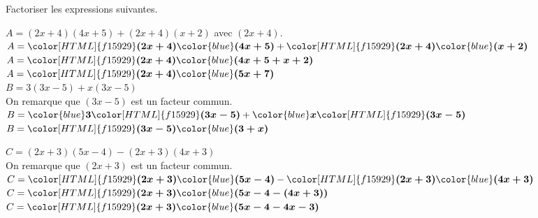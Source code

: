 \begin{corrige}
    Factoriser les expressions suivantes.
    \begin{itemize}
        \def\item{}
        \begin{spacing}{1.2}
            \item $A=(2x+4)(4x+5)+(2x+4)(x+2)$ avec $(2x+4)$.\\
            $A={\color[HTML]{f15929}\boldsymbol{(2x+4)}}{\color{blue}\boldsymbol{(4x+5)}}+{\color[HTML]{f15929}\boldsymbol{(2x+4)}}{\color{blue}\boldsymbol{(x+2)}}$\\
            $A={\color[HTML]{f15929}\boldsymbol{(2x+4)}}{\color{blue}\boldsymbol{(4x+5+x+2)}}$\\
            $A={\color[HTML]{f15929}\boldsymbol{(2x+4)}}{\color{blue}\boldsymbol{(5x+7)}}$\\
            \item $B = 3(3x-5)+x(3x-5)$\\
            On remarque que $(3x-5)$ est un facteur commun.\\
            $B={\color{blue}\boldsymbol{3}}{\color[HTML]{f15929}\boldsymbol{(3x-5)}}+{\color{blue}\boldsymbol{x}}{\color[HTML]{f15929}\boldsymbol{(3x-5)}}$\\
            $B={\color[HTML]{f15929}\boldsymbol{(3x-5)}}{\color{blue}\boldsymbol{(3+x)}}$\\
        \end{spacing}
    \end{itemize}
    \Coupe
    \begin{itemize}
        \def\item{}
        \begin{spacing}{1.2}            
            \item $C=(2x+3)(5x-4)-(2x+3)(4x+3)$\\
            On remarque que $(2x+3)$ est un facteur commun.\\
            $C={\color[HTML]{f15929}\boldsymbol{(2x+3)}}{\color{blue}\boldsymbol{(5x-4)}}-{\color[HTML]{f15929}\boldsymbol{(2x+3)}}{\color{blue}\boldsymbol{(4x+3)}}$\\
            $C={\color[HTML]{f15929}\boldsymbol{(2x+3)}}{\color{blue}\boldsymbol{(5x-4-(4x+3))}}$\\
            $C={\color[HTML]{f15929}\boldsymbol{(2x+3)}}{\color{blue}\boldsymbol{(5x-4-4x-3)}}$\\

\end{spacing}
\end{itemize}
\end{corrige}
